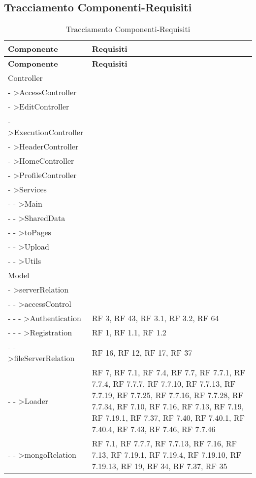 \subsection{Tracciamento Componenti-Requisiti}{ 
\renewcommand*{\arraystretch}{1.4} 
\begin{longtable} [c]{| p{8cm} | p{5cm} |} 
\caption{Tracciamento Componenti-Requisiti \label{tab:traccCompReq}}\\ \hline\textbf{Componente} & \textbf{Requisiti} \\ 
\hline \endfirsthead \hline 
\textbf{Componente} & \textbf{Requisiti} \\ 
\hline \endhead \hline \endfoot \hline \endlastfoot 
Controller & \\ 
 \hline 
- >AccessController & \\ 
 \hline 
- >EditController & \\ 
 \hline 
- >ExecutionController & \\ 
 \hline 
- >HeaderController & \\ 
 \hline 
- >HomeController & \\ 
 \hline 
- >ProfileController & \\ 
 \hline 
- >Services & \\ 
 \hline 
- - >Main & \\ 
 \hline 
- - >SharedData & \\ 
 \hline 
- - >toPages & \\ 
 \hline 
- - >Upload & \\ 
 \hline 
- - >Utils & \\ 
 \hline 
Model & \\ 
 \hline 
- >serverRelation & \\ 
 \hline 
- - >accessControl & \\ 
 \hline 
- - - >Authentication & RF 3, RF 43, RF 3.1, RF 3.2, RF 64\\ 
 \hline 
- - - >Registration & RF 1, RF 1.1, RF 1.2\\ 
 \hline 
- - >fileServerRelation & RF 16, RF 12, RF 17, RF 37\\ 
 \hline 
- - >Loader & RF 7, RF 7.1, RF 7.4, RF 7.7, RF 7.7.1, RF 7.7.4, RF 7.7.7, RF 7.7.10, RF 7.7.13, RF 7.7.19, RF 7.7.25, RF 7.7.16, RF 7.7.28, RF 7.7.34, RF 7.10, RF 7.16, RF 7.13, RF 7.19, RF 7.19.1, RF 7.37, RF 7.40, RF 7.40.1, RF 7.40.4, RF 7.43, RF 7.46, RF 7.7.46\\ 
 \hline 
- - >mongoRelation & RF 7.1, RF 7.7.7, RF 7.7.13, RF 7.16, RF 7.13, RF 7.19.1, RF 7.19.4, RF 7.19.10, RF 7.19.13, RF 19, RF 34, RF 7.37, RF 35\\ 

\end{longtable}}
